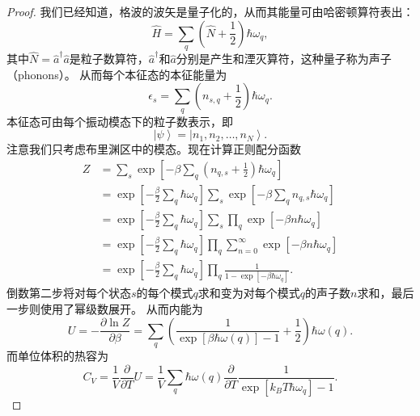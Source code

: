 \begin{proof}\small
    我们已经知道，格波的波矢是量子化的，从而其能量可由哈密顿算符表出：
    \begin{equation}
        \hat H = \sum_q (\hat N + \frac{1}{2}) \hbar \omega_q,
    \end{equation}
    其中$\hat N = \hat a^\dagger \hat a$是粒子数算符，$\hat a^\dagger$和$\hat a$分别是产生和湮灭算符，这种量子称为声子（phonons）。
    从而每个本征态的本征能量为
    \begin{equation}
        \epsilon_s = \sum_q (n_{s,q} + \frac{1}{2}) \hbar \omega_q.
    \end{equation}
    本征态可由每个振动模态下的粒子数表示，即
    \begin{equation}
        \left| \psi \right> = \left| n_1, n_2, \dots, n_N \right>.
    \end{equation}
    注意我们只考虑布里渊区中的模态。现在计算正则配分函数
    \begin{equation}
        \begin{aligned}
            Z &= \sum_s \exp \left[ -\beta \sum_q (n_{q,s} + \frac{1}{2}) \hbar \omega_q \right] \\
            &= \exp \left[-\frac{\beta}{2} \sum_q \hbar \omega_q\right] \sum_s \exp\left[-\beta \sum_q n_{q,s} \hbar \omega_q\right] \\
            &= \exp \left[-\frac{\beta}{2} \sum_q \hbar \omega_q\right] \sum_s \prod_q \exp \left[ -\beta n \hbar \omega_q \right] \\
            &= \exp \left[-\frac{\beta}{2} \sum_q \hbar \omega_q\right] \prod_q \sum_{n = 0}^{\infty} \exp \left[ -\beta n \hbar \omega_q \right] \\
            & = \exp \left[-\frac{\beta}{2} \sum_q \hbar \omega_q\right] \prod_q \frac{1}{1-\exp[-\beta\hbar\omega_q]}.
        \end{aligned}
    \end{equation}
    倒数第二步将对每个状态$s$的每个模式$q$求和变为对每个模式$q$的声子数$n$求和，最后一步则使用了幂级数展开。
    从而内能为
    \begin{equation}
        U = - \frac{\partial \ln Z}{\partial \beta} = \sum_q \left(\frac{1}{\exp[\beta\hbar\omega(q)]-1} + \frac{1}{2} \right) \hbar \omega(q).
    \end{equation}
    而单位体积的热容为
    \begin{equation}
        C_V = \frac{1}{V} \frac{\partial}{\partial T} U = \frac{1}{V} \sum_q \hbar \omega(q) \frac{\partial}{\partial T} \frac{1}{\exp[k_B T \hbar \omega_q ] - 1}.
    \end{equation}
\end{proof}


